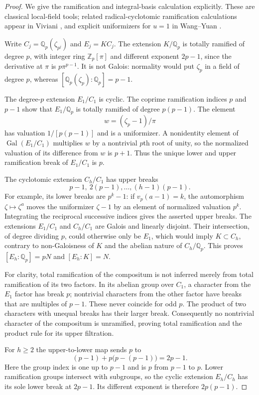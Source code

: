 \begin{proof}
We give the ramification and integral-basis calculation explicitly.
These are classical local-field tools; related radical-cyclotomic
ramification calculations appear in Viviani \cite{Viviani}, and explicit
uniformizers for $u=1$ in Wang--Yuan \cite{WangYuan}.

Write $C_j=\mathbb Q_p(\zeta_{p^j})$ and $E_j=KC_j$.
The extension $K/\mathbb Q_p$ is totally ramified of degree $p$, with
integer ring $\mathbb Z_p[\pi]$ and different exponent $2p-1$,
since the derivative at $\pi$ is $p\pi^{p-1}$.
It is not Galois: normality would put $\zeta_p$ in a field of degree $p$,
whereas $[\mathbb Q_p(\zeta_p):\mathbb Q_p]=p-1$.

The degree-$p$ extension $E_1/C_1$ is cyclic. The coprime ramification
indices $p$ and $p-1$ show that $E_1/\mathbb Q_p$ is totally ramified
of degree $p(p-1)$. The element
\[
 w=(\zeta_p-1)/\pi
\]
has valuation $1/[p(p-1)]$ and is a uniformizer. A nonidentity element
of $\operatorname{Gal}(E_1/C_1)$ multiplies $w$ by a nontrivial
$p$th root of unity, so the normalized valuation of its difference
from $w$ is $p+1$. Thus the unique lower and upper ramification break
of $E_1/C_1$ is $p$.

The cyclotomic extension $C_h/C_1$ has upper breaks
\[
 p-1,\ 2(p-1),\ldots,(h-1)(p-1).
\]
For example, its lower breaks are $p^k-1$: if
$v_p(a-1)=k$, the automorphism $\zeta\mapsto\zeta^a$ moves the
uniformizer $\zeta-1$ by an element of normalized valuation $p^k$.
Integrating the reciprocal successive indices gives the asserted upper
breaks. The extensions $E_1/C_1$ and $C_h/C_1$ are Galois and linearly
disjoint. Their intersection, of degree dividing $p$, could otherwise
only be $E_1$, which would imply $K\subset C_h$, contrary to
non-Galoisness of $K$ and the abelian nature of $C_h/\mathbb Q_p$.
This proves $[E_h:\mathbb Q_p]=pN$ and $[E_h:K]=N$.

For clarity, total ramification of the compositum is not inferred merely
from total ramification of its two factors. In its abelian group over
$C_1$, a character from the $E_1$ factor has break $p$; nontrivial
characters from the other factor have breaks that are multiples of
$p-1$. These never coincide for odd $p$. The product of two characters
with unequal breaks has their larger break. Consequently no nontrivial
character of the compositum is unramified, proving total ramification
and the product rule for its upper filtration.

For $h\ge2$ the upper-to-lower map sends $p$ to
\[
 (p-1)+p\bigl(p-(p-1)\bigr)=2p-1.
\]
Here the group index is one up to $p-1$ and is $p$ from $p-1$ to $p$.
Lower ramification groups intersect with subgroups, so the cyclic
extension $E_h/C_h$ has its sole lower break at $2p-1$.
Its different exponent is therefore $2p(p-1)$.


\end{proof}
